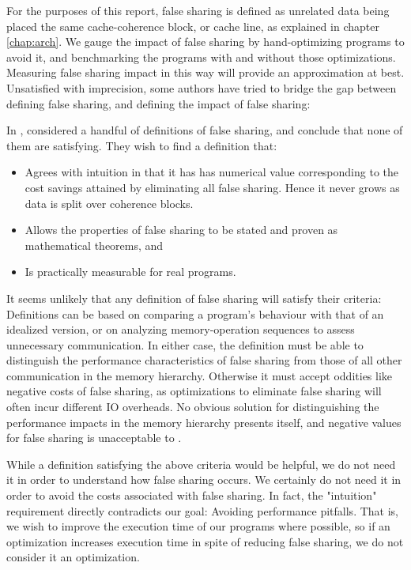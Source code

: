 For the purposes of this report, false sharing is defined as unrelated data
being placed the same cache-coherence block, or cache line, as explained in
chapter \ref{chap:arch}. We gauge the impact of false sharing by hand-optimizing
programs to avoid it, and benchmarking the programs with and without those
optimizations. Measuring false sharing impact in this way will provide an
approximation at best. Unsatisfied with imprecision, some authors have tried to
bridge the gap between defining false sharing, and defining the impact of
false sharing:

In \citeyear{falsedef}, \citeauthor{falsedef} \cite{falsedef} considered a handful
of definitions of false sharing, and conclude that none of them are satisfying.
They wish to find a definition that:

\begin{itemize}
	\item Agrees with intuition in that it has has numerical value
		corresponding to the cost savings attained by eliminating all
		false sharing. Hence it never grows as data is split over
		coherence blocks.
	\item Allows the properties of false sharing to be stated and proven as
		mathematical theorems, and
	\item Is practically measurable for real programs.
\end{itemize}

It seems unlikely that any definition of false sharing will satisfy their
criteria: Definitions can be based on comparing a program's
behaviour with that of an idealized version\footnotemark, or on analyzing
memory-operation sequences to assess unnecessary communication. In either case,
the definition must be able to distinguish the performance characteristics of false
sharing from those of all other communication in the memory hierarchy. Otherwise
it must accept oddities like negative costs of false sharing, as optimizations
to eliminate false sharing will often incur different IO overheads. No obvious
solution for distinguishing the performance impacts in the memory hierarchy
presents itself, and negative values for false sharing is unacceptable to
\citeauthor{falsedef}.

While a definition satisfying the above criteria would be helpful, we do not
need it in order to understand how false sharing occurs. We certainly
do not need it in order to avoid the costs associated with false sharing. In
fact, the "intuition" requirement directly contradicts our goal: Avoiding
performance pitfalls. That is, we wish to improve the execution time of our
programs where possible, so if an optimization increases execution time in spite
of reducing false sharing, we do not consider it an optimization.

